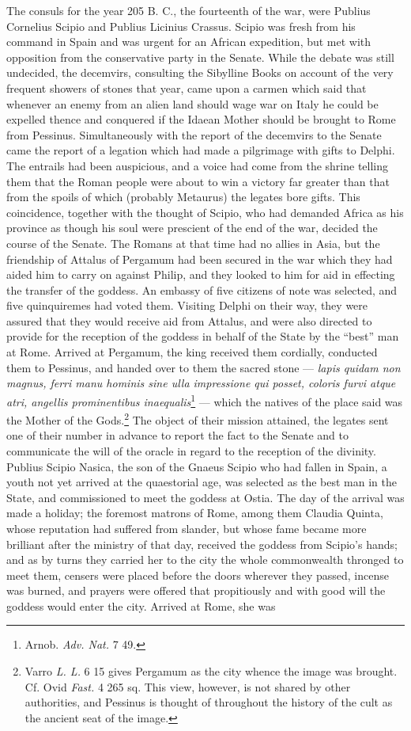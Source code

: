 \documentclass[a4paper, 11pt, oneside, polutonikogreek, english]{article}
\begin{document}
The consuls for the year 205 B. C., the fourteenth of the war, were Publius Cornelius Scipio and Publius Licinius Crassus. Scipio was fresh from his command in Spain and was urgent for an African expedition, but met with opposition from the conservative party in the Senate. While the debate was still undecided, the decemvirs, consulting the Sibylline Books on account of the very frequent showers of stones that year, came upon a carmen which said that whenever an enemy from an alien land should wage war on Italy he could be expelled thence and conquered if the Idaean Mother should be brought to Rome from Pessinus. Simultaneously with the report of the decemvirs to the Senate came the report of a legation which had made a pilgrimage with gifts to Delphi. The entrails had been auspicious, and a voice had come from the shrine telling them that the Roman people were about to win a victory far greater than that from the spoils of which (probably Metaurus) the legates bore gifts. This coincidence, together with the thought of Scipio, who had demanded Africa as his province as though his soul were prescient of the end of the war, decided the course of the Senate. The Romans at that time had no allies in Asia, but the friendship of Attalus of Pergamum had been secured in the war which they had aided him to carry on against Philip, and they looked to him for aid in effecting the transfer of the goddess. An embassy of five citizens of note was selected, and five quinquiremes had voted them. Visiting Delphi on their way, they were assured that they would receive aid from Attalus, and were also directed to provide for the reception of the goddess in behalf of the State by the ``best'' man at Rome. Arrived at Pergamum, the king received them cordially, conducted them to Pessinus, and handed over to them the sacred stone --- \emph{lapis quidam non magnus, ferri manu hominis sine ulla impressione qui posset, coloris furvi atque atri, angellis prominentibus inaequalis}\footnote{Arnob. \emph{Adv. Nat.} 7 49.} --- which the natives of the place said was the Mother of the Gods.\footnote{Varro \emph{L. L.} 6 15 gives Pergamum as the city whence the image was brought. Cf. Ovid \emph{Fast.} 4 265 sq. This view, however, is not shared by other authorities, and Pessinus is thought of throughout the history of the cult as the ancient seat of the image.} The object of their mission attained, the legates sent one of their number in advance to report the fact to the Senate and to communicate the will of the oracle in regard to the reception of the divinity. Publius Scipio Nasica, the son of the Gnaeus Scipio who had fallen in Spain, a youth not yet arrived at the quaestorial age, was selected as the best man in the State, and commissioned to meet the goddess at Ostia. The day of the arrival was made a holiday; the foremost matrons of Rome, among them Claudia Quinta, whose reputation had suffered from slander, but whose fame became more brilliant after the ministry of that day, received the goddess from Scipio's hands; and as by turns they carried her to the city the whole commonwealth thronged to meet them, censers were placed before the doors wherever they passed, incense was burned, and prayers were offered that propitiously and with good will the goddess would enter the city. Arrived at Rome, she was 
\end{document}
